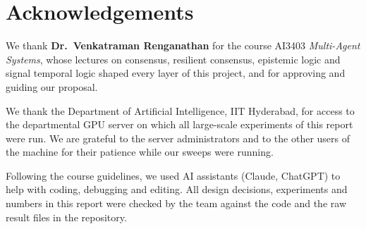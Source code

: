 \chapter*{Acknowledgements}
\thispagestyle{plain}

We thank \textbf{Dr.\ Venkatraman Renganathan} for the course AI3403 \emph{Multi-Agent Systems}, whose lectures on
consensus, resilient consensus, epistemic logic and signal temporal logic shaped every layer of this project, and for
approving and guiding our proposal.

We thank the Department of Artificial Intelligence, IIT Hyderabad, for access to the departmental GPU server on which
all large-scale experiments of this report were run. We are grateful to the server administrators and to the other
users of the machine for their patience while our sweeps were running.

Following the course guidelines, we used AI assistants (Claude, ChatGPT) to help with coding, debugging and editing. All
design decisions, experiments and numbers in this report were checked by the team against the code and the raw result
files in the repository.

